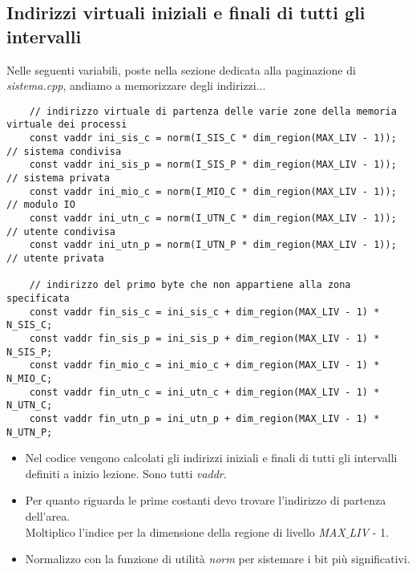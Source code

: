 \subsection{Indirizzi virtuali iniziali e finali di tutti gli intervalli}
Nelle seguenti variabili, poste nella sezione dedicata alla paginazione di \emph{sistema.cpp}, andiamo a memorizzare degli indirizzi...
\small 
\begin{verbatim}
	// indirizzo virtuale di partenza delle varie zone della memoria virtuale dei processi
	const vaddr ini_sis_c = norm(I_SIS_C * dim_region(MAX_LIV - 1)); // sistema condivisa
	const vaddr ini_sis_p = norm(I_SIS_P * dim_region(MAX_LIV - 1)); // sistema privata
	const vaddr ini_mio_c = norm(I_MIO_C * dim_region(MAX_LIV - 1)); // modulo IO
	const vaddr ini_utn_c = norm(I_UTN_C * dim_region(MAX_LIV - 1)); // utente condivisa
	const vaddr ini_utn_p = norm(I_UTN_P * dim_region(MAX_LIV - 1)); // utente privata
	
	// indirizzo del primo byte che non appartiene alla zona specificata
	const vaddr fin_sis_c = ini_sis_c + dim_region(MAX_LIV - 1) * N_SIS_C;
	const vaddr fin_sis_p = ini_sis_p + dim_region(MAX_LIV - 1) * N_SIS_P;
	const vaddr fin_mio_c = ini_mio_c + dim_region(MAX_LIV - 1) * N_MIO_C;
	const vaddr fin_utn_c = ini_utn_c + dim_region(MAX_LIV - 1) * N_UTN_C;
	const vaddr fin_utn_p = ini_utn_p + dim_region(MAX_LIV - 1) * N_UTN_P;
\end{verbatim}
\normalsize 
\begin{itemize}
	\item Nel codice vengono calcolati gli indirizzi iniziali e finali di tutti gli intervalli definiti a inizio lezione. Sono tutti \emph{vaddr}.
	\item Per quanto riguarda le prime costanti devo trovare l'indirizzo di partenza dell'area.\\Moltiplico l'indice per la dimensione della regione di livello \emph{MAX$\_$LIV} - 1.
	\item Normalizzo con la funzione di utilità \emph{norm} per sistemare i bit più significativi.
\end{itemize}

